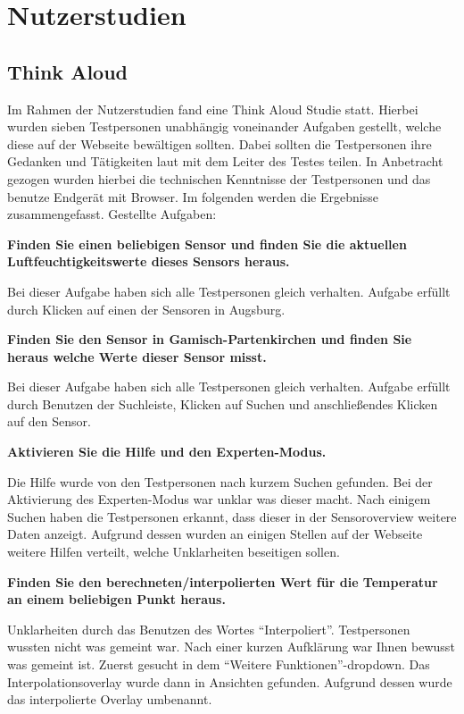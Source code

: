 \section{Nutzerstudien}
\subsection{Think Aloud}
Im Rahmen der Nutzerstudien fand eine Think Aloud Studie statt. Hierbei wurden sieben Testpersonen unabhängig voneinander Aufgaben gestellt,
welche diese auf der Webseite bewältigen sollten. Dabei sollten die Testpersonen ihre Gedanken und Tätigkeiten laut mit dem Leiter des Testes teilen.
In Anbetracht gezogen wurden hierbei die technischen Kenntnisse der Testpersonen und das benutze Endgerät mit Browser. Im folgenden werden die Ergebnisse zusammengefasst.
Gestellte Aufgaben:

\textbf{Finden Sie einen beliebigen Sensor und finden Sie die aktuellen Luftfeuchtigkeitswerte dieses Sensors heraus.}

Bei dieser Aufgabe haben sich alle Testpersonen gleich verhalten. 
Aufgabe erfüllt durch Klicken auf einen der Sensoren in Augsburg.

\textbf{Finden Sie den Sensor in Gamisch-Partenkirchen und finden Sie heraus welche Werte dieser Sensor misst.}

Bei dieser Aufgabe haben sich alle Testpersonen gleich verhalten. 
Aufgabe erfüllt durch Benutzen der Suchleiste, Klicken auf Suchen und anschließendes Klicken auf den Sensor.

\textbf{Aktivieren Sie die Hilfe und den Experten-Modus.}

Die Hilfe wurde von den Testpersonen nach kurzem Suchen gefunden.
Bei der Aktivierung des Experten-Modus war unklar was dieser macht. Nach einigem Suchen haben die Testpersonen erkannt, dass dieser in der Sensoroverview weitere Daten anzeigt.
Aufgrund dessen wurden an einigen Stellen auf der Webseite weitere Hilfen verteilt, welche Unklarheiten beseitigen sollen. 

\textbf{Finden Sie den berechneten/interpolierten Wert für die Temperatur an einem beliebigen Punkt heraus.}

Unklarheiten durch das Benutzen des Wortes \enquote{Interpoliert}. Testpersonen wussten nicht was gemeint war. Nach einer kurzen Aufklärung war Ihnen bewusst
was gemeint ist. 
Zuerst gesucht in dem \enquote{Weitere Funktionen}-dropdown. Das Interpolationsoverlay wurde dann in Ansichten gefunden.
Aufgrund dessen wurde das interpolierte Overlay umbenannt. 

